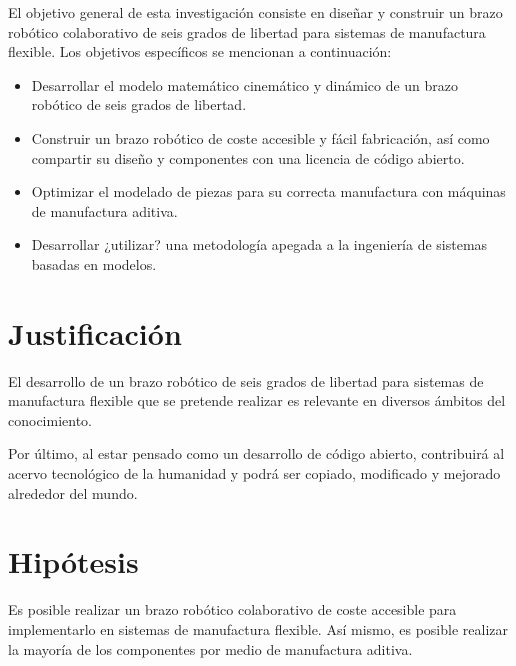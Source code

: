 El objetivo general de esta investigación consiste en diseñar y construir un brazo robótico colaborativo de seis grados de libertad para sistemas de manufactura flexible. Los objetivos específicos se mencionan a continuación:

\begin{itemize}
\item Desarrollar el modelo matemático cinemático y dinámico de un brazo robótico de seis grados de libertad.
\item Construir un brazo robótico de coste accesible y fácil fabricación, así como compartir su diseño y componentes con una licencia de código abierto. 
\item Optimizar el modelado de piezas para su correcta manufactura con máquinas de manufactura aditiva.
\item Desarrollar ¿utilizar? una metodología apegada a la ingeniería de sistemas basadas en modelos.
\end{itemize}

\section{Justificación}

El desarrollo de un brazo robótico de seis grados de libertad para sistemas de manufactura flexible que se pretende realizar es relevante en diversos ámbitos del conocimiento. 

Por último, al estar pensado como un desarrollo de código abierto, contribuirá al acervo tecnológico de la humanidad y podrá ser copiado, modificado y mejorado alrededor del mundo. 


\section{Hipótesis}

Es posible realizar un brazo robótico colaborativo de coste accesible para implementarlo en sistemas de manufactura flexible. Así mismo, es posible realizar la mayoría de los componentes por medio de manufactura aditiva.

